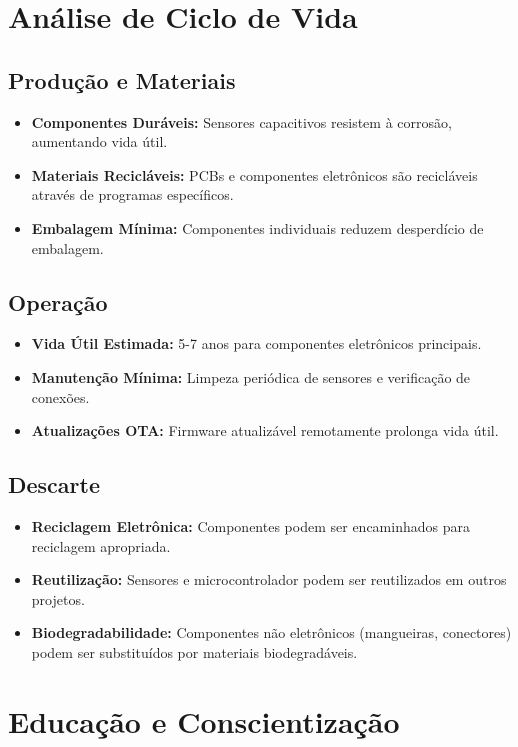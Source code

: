 \documentclass[twoside,english,brazilian]{UNISINOSmonografia}
\begin{document}
\section{Análise de Ciclo de Vida}

\subsection{Produção e Materiais}
\begin{itemize}
    \item \textbf{Componentes Duráveis:} Sensores capacitivos resistem à corrosão, aumentando vida útil.
    \item \textbf{Materiais Recicláveis:} PCBs e componentes eletrônicos são recicláveis através de programas específicos.
    \item \textbf{Embalagem Mínima:} Componentes individuais reduzem desperdício de embalagem.
\end{itemize}

\subsection{Operação}
\begin{itemize}
    \item \textbf{Vida Útil Estimada:} 5-7 anos para componentes eletrônicos principais.
    \item \textbf{Manutenção Mínima:} Limpeza periódica de sensores e verificação de conexões.
    \item \textbf{Atualizações OTA:} Firmware atualizável remotamente prolonga vida útil.
\end{itemize}

\subsection{Descarte}
\begin{itemize}
    \item \textbf{Reciclagem Eletrônica:} Componentes podem ser encaminhados para reciclagem apropriada.
    \item \textbf{Reutilização:} Sensores e microcontrolador podem ser reutilizados em outros projetos.
    \item \textbf{Biodegradabilidade:} Componentes não eletrônicos (mangueiras, conectores) podem ser substituídos por materiais biodegradáveis.
\end{itemize}

\section{Educação e Conscientização}
\end{document}
